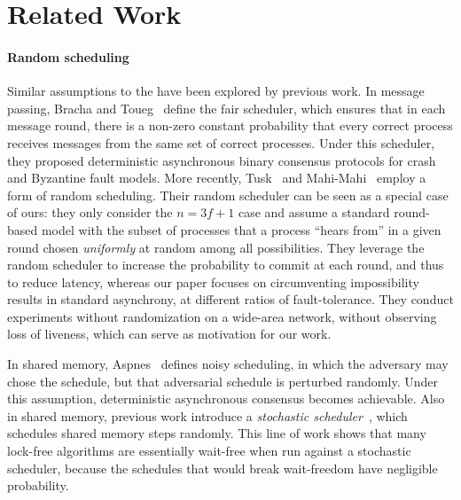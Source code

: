 \section{Related Work}

\paragraph{Random scheduling}
Similar assumptions to the \model have been explored by previous work. In message passing, Bracha and Toueg~\cite{BrachaT85} define the fair scheduler, which ensures that in each message round, there is a non-zero constant probability that every correct process receives messages from the same set of correct processes. Under this scheduler, they proposed deterministic asynchronous binary consensus protocols for crash and Byzantine fault models. 
More recently, Tusk~\cite{narwhal} and Mahi-Mahi~\cite{mahimahi} employ a form of random scheduling. Their random scheduler can be seen as a special case of ours: they only consider the $n=3f+1$ case and assume a standard round-based model with the subset of processes that a process ``hears from'' in a given round chosen \textit{uniformly} at random among all possibilities. They leverage the random scheduler to increase the probability to commit at each round, and thus to reduce latency, whereas our paper focuses on circumventing impossibility results in standard asynchrony, at different ratios of fault-tolerance. They conduct experiments without randomization on a wide-area network, without observing loss of liveness, which can serve as motivation for our work.

In shared memory, Aspnes~\cite{Aspnes02} defines noisy scheduling, in which the adversary may chose the schedule, but that adversarial schedule is perturbed randomly. Under this assumption, deterministic asynchronous consensus becomes achievable. Also in shared memory, previous work introduce a \textit{stochastic scheduler}~\cite{AlistarhSV15,AlistarhCS16}, which schedules shared memory steps randomly. This line of work shows that many lock-free algorithms are essentially wait-free when run against a stochastic scheduler, because the schedules that would break wait-freedom have negligible probability.

